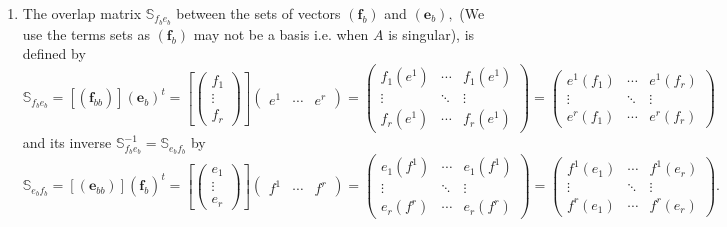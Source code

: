 \documentclass[aps,preprint]{revtex4}
\begin{document}
\begin{enumerate}
\begin{enumerate}
\item The overlap matrix $\mathbb{S}_{f_{b}e_{b}}$ between the sets of
vectors $\left( \boldsymbol{f}_{b}\right) $ and $\left( \boldsymbol{e}%
_{b}\right) ,$ (We use the terms sets as $\left( \boldsymbol{f}_{b}\right) $
may not be a basis i.e. when $A$ is singular), is defined by 
\begin{equation}
\mathbb{S}_{f_{b}e_{b}}=\left[ \left( \overset{}{\boldsymbol{f}_{bb}}\right) %
\right] \left( \overset{}{\boldsymbol{e}_{b}}\right) ^{t}=\left[ \left( 
\begin{array}{c}
f_{1} \\ 
\vdots \\ 
f_{r}%
\end{array}%
\right) \right] \left( 
\begin{array}{ccc}
e^{1} & \cdots & e^{r}%
\end{array}%
\right) =\left( 
\begin{array}{ccc}
f_{1}\left( e^{1}\right) & \cdots & f_{1}\left( e^{1}\right) \\ 
\vdots & \ddots & \vdots \\ 
f_{r}\left( e^{1}\right) & \cdots & f_{r}\left( e^{1}\right)%
\end{array}%
\right) =\left( 
\begin{array}{ccc}
e^{1}\left( f_{1}\right) & \cdots & e^{1}\left( f_{r}\right) \\ 
\vdots & \ddots & \vdots \\ 
e^{r}\left( f_{1}\right) & \cdots & e^{r}\left( f_{r}\right)%
\end{array}%
\right)
\end{equation}%
and its inverse $\mathbb{S}_{f_{b}e_{b}}^{-1}=\mathbb{S}_{e_{b}f_{b}}$ by 
\begin{equation}
\mathbb{S}_{e_{b}f_{b}}=\left[ \left( \overset{}{\boldsymbol{e}_{bb}}\right) %
\right] \left( \overset{}{\boldsymbol{f}_{b}}\right) ^{t}=\left[ \left( 
\begin{array}{c}
e_{1} \\ 
\vdots \\ 
e_{r}%
\end{array}%
\right) \right] \left( 
\begin{array}{ccc}
f^{1} & \cdots & f^{r}%
\end{array}%
\right) =\left( 
\begin{array}{ccc}
e_{1}\left( f^{1}\right) & \cdots & e_{1}\left( f^{1}\right) \\ 
\vdots & \ddots & \vdots \\ 
e_{r}\left( f^{r}\right) & \cdots & e_{r}\left( f^{r}\right)%
\end{array}%
\right) =\left( 
\begin{array}{ccc}
f^{1}\left( e_{1}\right) & \cdots & f^{1}\left( e_{r}\right) \\ 
\vdots & \ddots & \vdots \\ 
f^{r}\left( e_{1}\right) & \cdots & f^{r}\left( e_{r}\right)%
\end{array}%
\right) .
\end{equation}


\end{enumerate}
\end{enumerate}
\end{document}

